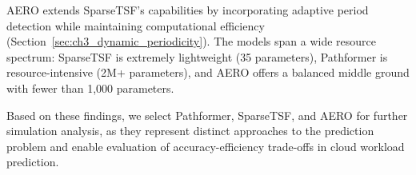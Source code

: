 \ac{AERO} extends \ac{SparseTSF}'s capabilities by incorporating adaptive period detection while maintaining computational efficiency (Section~\ref{sec:ch3_dynamic_periodicity}). The models span a wide resource spectrum: \ac{SparseTSF} is extremely lightweight (35 parameters), Pathformer is resource-intensive (2M+ parameters), and \ac{AERO} offers a balanced middle ground with fewer than 1,000 parameters.

Based on these findings, we select Pathformer, \ac{SparseTSF}, and \ac{AERO} for further simulation analysis, as they represent distinct approaches to the prediction problem and enable evaluation of accuracy-efficiency trade-offs in cloud workload prediction.
